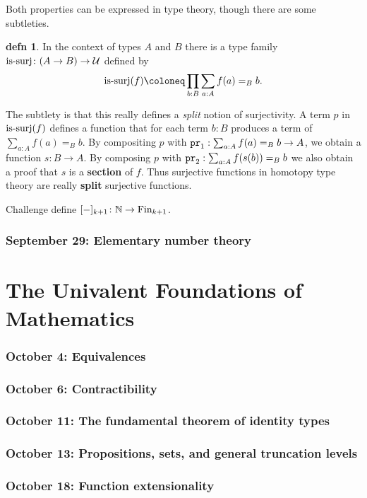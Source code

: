 \documentclass{amsart}
\theoremstyle{theorem}
\theoremstyle{definition}
\newtheorem*{defn}{defn}
\theoremstyle{remark}
\newcommand{\0}{\mathbbe{0}}
\newcommand{\1}{\mathbbe{1}}
\newcommand{\2}{\mathbbe{2}}
\newcommand{\3}{\mathbbe{3}}
\newcommand{\4}{\mathbbe{4}}
\newcommand{\term}[1]{{\textup{\texttt{#1}}}}
\newcommand{\type}[1]{{\textup{#1}}}
\newcommand{\bN}{{\mathbb{N}}}
\newcommand{\pr}{\term{pr}}
\newcommand{\UU}{\mathcal{U}}
\begin{document}
Both properties can be expressed in type theory, though there are some subtleties.

\begin{defn} In the context of types $A$ and $B$ there is a type family $\type{is-surj} \colon (A \to B) \to \UU$ defined by
\[ \type{is-surj}(f) \coloneq \prod_{b : B} \sum_{a : A} f(a) =_B b.\]
\end{defn}

The subtlety is that this really defines a \emph{split} notion of surjectivity. A term $p$ in $\type{is-surj}(f)$ defines a function that for each term $b : B$ produces a term of $\sum_{a : A} f(a) =_B b$. By compositing $p$ with $\pr_1 : \sum_{a : A} f(a) =_B b \to A$, we obtain a function $s \colon B \to A$. By composing $p$ with $\pr_2 : \sum_{a : A} f(s(b)) =_B b$ we also obtain a proof that $s$ is a \textbf{section} of $f$. Thus surjective functions in homotopy type theory are really \textbf{split} surjective functions.

Challenge define $[-]_{k+1} \colon \bN \to \type{Fin}_{k+1}$.


\section*{September 29: Elementary number theory}

\part{The Univalent Foundations of Mathematics}

\section*{October 4: Equivalences}
\section*{October 6: Contractibility}
\section*{October 11: The fundamental theorem of identity types}
\section*{October 13: Propositions, sets, and general truncation levels}
\section*{October 18: Function extensionality}
\end{document}
